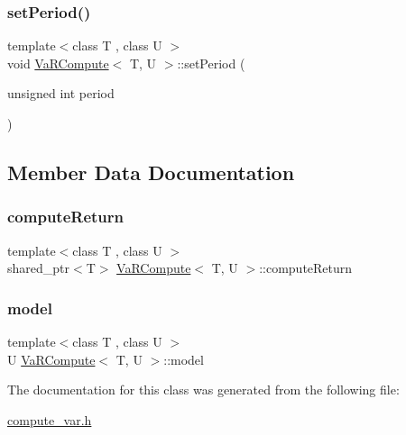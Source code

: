 \hypertarget{classVaRCompute_a071d01ccfd965e5a02d2ce4f3eee5db2}{}\label{classVaRCompute_a071d01ccfd965e5a02d2ce4f3eee5db2} 
\subsubsection{\texorpdfstring{set\+Period()}{setPeriod()}}
{\footnotesize\ttfamily template$<$class T , class U $>$ \\
void \hyperlink{classVaRCompute}{Va\+R\+Compute}$<$ T, U $>$\+::set\+Period (\begin{DoxyParamCaption}\item[{unsigned int}]{period }\end{DoxyParamCaption})\hspace{0.3cm}{\ttfamily [inline]}}



\subsection{Member Data Documentation}
\hypertarget{classVaRCompute_a44d8fd1ac0cd7c920e1fc255f11a92ee}{}\label{classVaRCompute_a44d8fd1ac0cd7c920e1fc255f11a92ee} 
\subsubsection{\texorpdfstring{compute\+Return}{computeReturn}}
{\footnotesize\ttfamily template$<$class T , class U $>$ \\
shared\+\_\+ptr$<$T$>$ \hyperlink{classVaRCompute}{Va\+R\+Compute}$<$ T, U $>$\+::compute\+Return\hspace{0.3cm}{\ttfamily [protected]}}

\hypertarget{classVaRCompute_a2de1fc8b4d4df387d0495981bde72564}{}\label{classVaRCompute_a2de1fc8b4d4df387d0495981bde72564} 
\subsubsection{\texorpdfstring{model}{model}}
{\footnotesize\ttfamily template$<$class T , class U $>$ \\
U \hyperlink{classVaRCompute}{Va\+R\+Compute}$<$ T, U $>$\+::model\hspace{0.3cm}{\ttfamily [protected]}}



The documentation for this class was generated from the following file\+:\begin{DoxyCompactItemize}
\item 
\hyperlink{compute__var_8h}{compute\+\_\+var.\+h}\end{DoxyCompactItemize}
